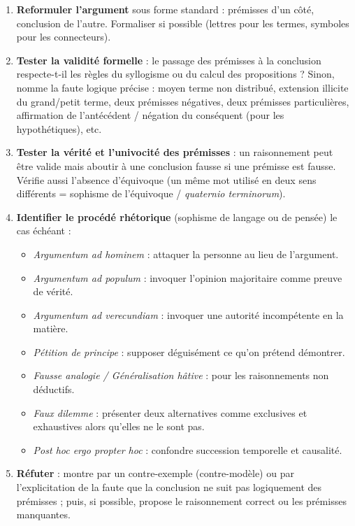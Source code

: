 \documentclass[11pt]{article}
\newcommand{\cle}[1]{{\popxbold\color{popdark}#1}}
\begin{document}
\begin{methode}
\begin{enumerate}
\item \textbf{Reformuler l'argument} sous forme standard : prémisses d'un côté, conclusion de l'autre. Formaliser si possible (lettres pour les termes, symboles pour les connecteurs).
\item \textbf{Tester la validité formelle} : le passage des prémisses à la conclusion respecte-t-il les règles du syllogisme ou du calcul des propositions ? Sinon, nomme la faute logique précise : moyen terme non distribué, extension illicite du grand/petit terme, deux prémisses négatives, deux prémisses particulières, affirmation de l'antécédent / négation du conséquent (pour les hypothétiques), etc.
\item \textbf{Tester la vérité et l'univocité des prémisses} : un raisonnement peut être valide mais aboutir à une conclusion fausse si une prémisse est fausse. Vérifie aussi l'absence d'\cle{équivoque} (un même mot utilisé en deux sens différents = sophisme de l'équivoque / \textit{quaternio terminorum}).
\item \textbf{Identifier le procédé rhétorique} (sophisme de langage ou de pensée) le cas échéant :
      \begin{itemize}
      \item \emph{Argumentum ad hominem} : attaquer la personne au lieu de l'argument.
      \item \emph{Argumentum ad populum} : invoquer l'opinion majoritaire comme preuve de vérité.
      \item \emph{Argumentum ad verecundiam} : invoquer une autorité incompétente en la matière.
      \item \emph{Pétition de principe} : supposer déguisément ce qu'on prétend démontrer.
      \item \emph{Fausse analogie / Généralisation hâtive} : pour les raisonnements non déductifs.
      \item \emph{Faux dilemme} : présenter deux alternatives comme exclusives et exhaustives alors qu'elles ne le sont pas.
      \item \emph{Post hoc ergo propter hoc} : confondre succession temporelle et causalité.
      \end{itemize}
\item \textbf{Réfuter} : montre par un contre-exemple (contre-modèle) ou par l'explicitation de la faute que la conclusion ne suit pas logiquement des prémisses ; puis, si possible, propose le raisonnement correct ou les prémisses manquantes.
\end{enumerate}
\end{methode}
\end{document}
